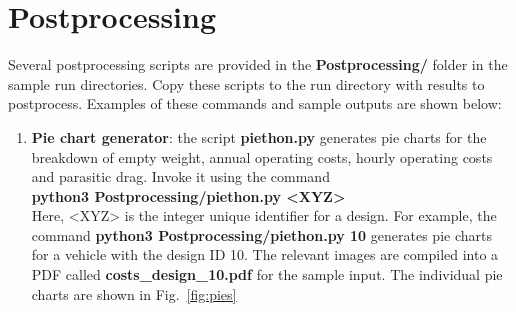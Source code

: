 \section{Postprocessing}
Several postprocessing scripts are provided in the \textbf{Postprocessing/} folder in the sample run directories. Copy these scripts to the run directory with results to postprocess. Examples of these commands and sample outputs are shown below:
\begin{enumerate}
\item \textbf{Pie chart generator}: the script \textbf{piethon.py} generates pie charts for the breakdown of empty weight, annual operating costs, hourly operating costs and parasitic drag. Invoke it using the command \\
\textbf{python3 Postprocessing/piethon.py <XYZ>} \\
Here, <XYZ> is the integer unique identifier for a design. For example,  the command \textbf{python3 Postprocessing/piethon.py 10} generates pie charts for a vehicle with the design ID 10. The relevant images are compiled into a PDF called \textbf{costs\_design\_10.pdf} for the sample input.  The individual pie charts are shown in Fig.~\ref{fig:pies}


\end{enumerate}
